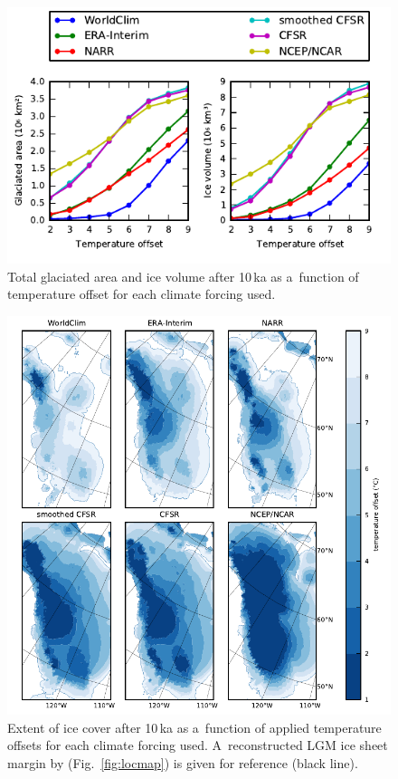 \documentclass[tc, ms]{copernicus}
\begin{document}
\begin{figure}[t]
	\vspace*{2mm}
	\begin{center}
		\includegraphics{cordillera-climate-ivolarea}
	\end{center}
	\caption{Total glaciated area and ice volume after 10\,ka as a~function of temperature offset for each climate forcing used.}
	\label{fig:ivolarea}
\end{figure}

\begin{figure}[t]
	\vspace*{2mm}
	\begin{center}
		\includegraphics{cordillera-climate-extent}
	\end{center}
	\caption{Extent of ice cover after 10\,ka as a~function of applied temperature offsets for each climate forcing used. A~reconstructed LGM ice sheet margin by \citet{dyke-2004} (Fig.~\ref{fig:locmap}) is given for reference (black line).}
	\label{fig:extent}
\end{figure}
\end{document}
